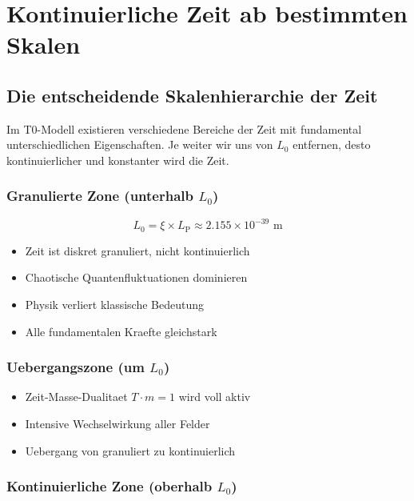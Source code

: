 \documentclass[12pt,a4paper]{article}
\newcommand{\xipar}{\xi}
\newcommand{\Lzero}{L_0}
\newcommand{\Lp}{L_{\text{P}}}
\theoremstyle{definition}
\theoremstyle{remark}
\begin{document}
	\section{Kontinuierliche Zeit ab bestimmten Skalen}
	
	\subsection{Die entscheidende Skalenhierarchie der Zeit}
	
	Im T0-Modell existieren verschiedene Bereiche der Zeit mit fundamental unterschiedlichen Eigenschaften. Je weiter wir uns von $\Lzero$ entfernen, desto kontinuierlicher und konstanter wird die Zeit.
	
	\subsubsection{Granulierte Zone (unterhalb $\Lzero$)}
	
	\begin{equation}
		\Lzero = \xipar \times \Lp \approx 2.155 \times 10^{-39} \text{ m}
	\end{equation}
	
	\begin{itemize}
		\item Zeit ist diskret granuliert, nicht kontinuierlich
		\item Chaotische Quantenfluktuationen dominieren
		\item Physik verliert klassische Bedeutung
		\item Alle fundamentalen Kraefte gleichstark
	\end{itemize}
	
	\subsubsection{Uebergangszone (um $\Lzero$)}
	
	\begin{itemize}
		\item Zeit-Masse-Dualitaet $T \cdot m = 1$ wird voll aktiv
		\item Intensive Wechselwirkung aller Felder
		\item Uebergang von granuliert zu kontinuierlich
	\end{itemize}
	
	\subsubsection{Kontinuierliche Zone (oberhalb $\Lzero$)}
	
\end{document}
